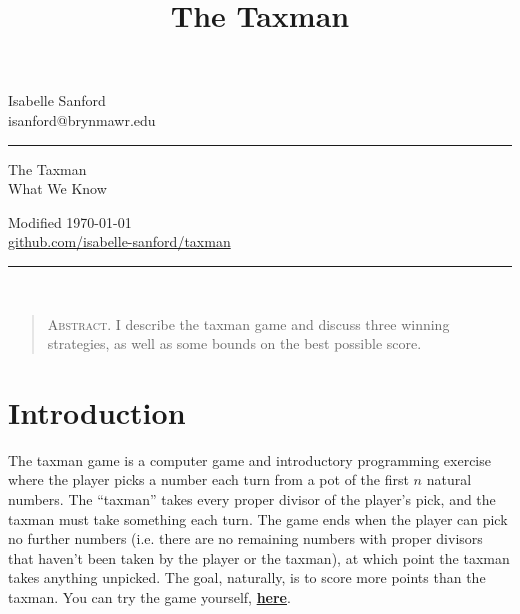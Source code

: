 \documentclass[a4paper,10pt]{amsart} %
\begin{document}

\title{The Taxman} %
\fancyhead[C]{}
\begin{minipage}{0.31\textwidth} %
\raggedright
Isabelle Sanford \\ 
\footnotesize %
isanford@brynmawr.edu
\medskip\hrule
\end{minipage}
\begin{minipage}{0.35\textwidth} %
\centering 
\large %
The Taxman\\ %
\normalsize %
What We Know \\ %
\end{minipage}
\begin{minipage}{0.31\textwidth} %
\raggedleft
Modified \today \\
\footnotesize %
\href{https://github.com/isabelle-sanford/taxman}{github.com/isabelle-sanford/taxman}
\medskip\hrule
\end{minipage}\\


\begin{quote}
    \textsc{Abstract.} I describe the taxman game and discuss three winning strategies, as well as some bounds on the best possible score.
\end{quote}
 

\section{Introduction} \label{intro}

The taxman game is a computer game and introductory programming exercise where the player picks a number each turn from a pot of the first $n$ natural numbers. The ``taxman'' takes every proper divisor of the player's pick, and the taxman must take something each turn. The game ends when the player can pick no further numbers (i.e. there are no remaining numbers with proper divisors that haven't been taken by the player or the taxman), at which point the taxman takes anything unpicked. The goal, naturally, is to score more points than the taxman. You can try the game yourself, \textbf{\href{https://www.dsm.fordham.edu/~moniot/taxman.html}{here}}. 
\end{document}

